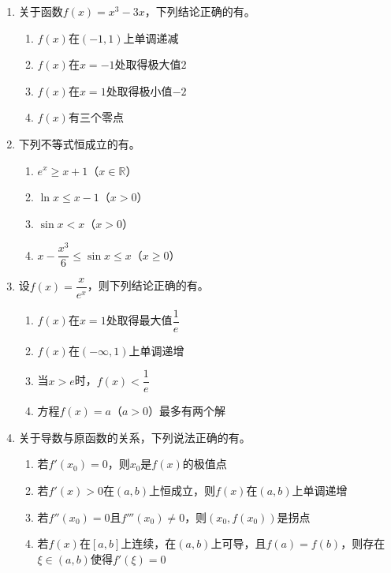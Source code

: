 \documentclass[12pt, a4paper]{ctexart}
\newcommand{\blank}[1]{\underline{\hspace{#1}}}
\begin{document}
\begin{enumerate}[start=9]
\item 关于函数$f(x)=x^3-3x$，下列结论正确的有\blank{3cm}。
\begin{enumerate}[label=\Alph*.]
\item $f(x)$在$(-1,1)$上单调递减
\item $f(x)$在$x=-1$处取得极大值$2$
\item $f(x)$在$x=1$处取得极小值$-2$
\item $f(x)$有三个零点
\end{enumerate}

\item 下列不等式恒成立的有\blank{3cm}。
\begin{enumerate}[label=\Alph*.]
\item $e^x\geq x+1$（$x\in\mathbb{R}$）
\item $\ln x\leq x-1$（$x>0$）
\item $\sin x < x$（$x>0$）
\item $x-\dfrac{x^3}{6}\leq\sin x\leq x$（$x\geq 0$）
\end{enumerate}

\item 设$f(x)=\dfrac{x}{e^x}$，则下列结论正确的有\blank{3cm}。
\begin{enumerate}[label=\Alph*.]
\item $f(x)$在$x=1$处取得最大值$\dfrac{1}{e}$
\item $f(x)$在$(-\infty,1)$上单调递增
\item 当$x>e$时，$f(x)<\dfrac{1}{e}$
\item 方程$f(x)=a$（$a>0$）最多有两个解
\end{enumerate}

\item 关于导数与原函数的关系，下列说法正确的有\blank{3cm}。
\begin{enumerate}[label=\Alph*.]
\item 若$f'(x_0)=0$，则$x_0$是$f(x)$的极值点
\item 若$f'(x)>0$在$(a,b)$上恒成立，则$f(x)$在$(a,b)$上单调递增
\item 若$f''(x_0)=0$且$f'''(x_0)\neq 0$，则$(x_0,f(x_0))$是拐点
\item 若$f(x)$在$[a,b]$上连续，在$(a,b)$上可导，且$f(a)=f(b)$，则存在$\xi\in(a,b)$使得$f'(\xi)=0$
\end{enumerate}
\end{enumerate}

\vspace{1em}
\end{document}
